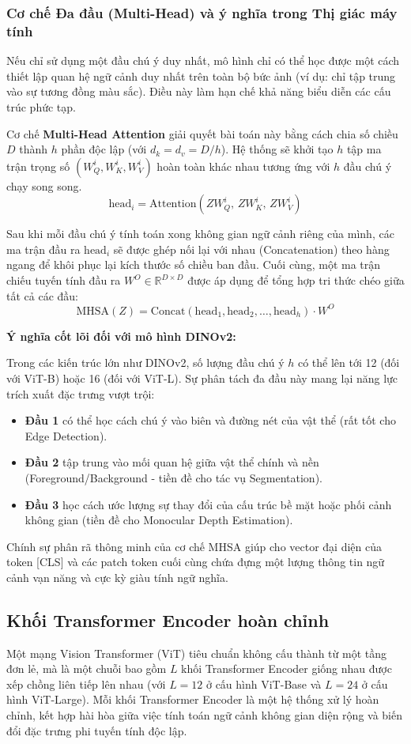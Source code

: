 \subsubsection{Cơ chế Đa đầu (Multi-Head) và ý nghĩa trong Thị giác máy tính}
Nếu chỉ sử dụng một đầu chú ý duy nhất, mô hình chỉ có thể học được một cách thiết lập quan hệ ngữ cảnh duy nhất trên toàn bộ bức ảnh (ví dụ: chỉ tập trung vào sự tương đồng màu sắc). Điều này làm hạn chế khả năng biểu diễn các cấu trúc phức tạp.

Cơ chế \textbf{Multi-Head Attention} giải quyết bài toán này bằng cách chia số chiều $D$ thành $h$ phần độc lập (với $d_k = d_v = D/h$). Hệ thống sẽ khởi tạo $h$ tập ma trận trọng số $(W_Q^i, W_K^i, W_V^i)$ hoàn toàn khác nhau tương ứng với $h$ đầu chú ý chạy song song.$$\text{head}_i = \text{Attention}(Z W_Q^i, \, Z W_K^i, \, Z W_V^i)$$

Sau khi mỗi đầu chú ý tính toán xong không gian ngữ cảnh riêng của mình, các ma trận đầu ra $\text{head}_i$ sẽ được ghép nối lại với nhau (Concatenation) theo hàng ngang để khôi phục lại kích thước số chiều ban đầu. Cuối cùng, một ma trận chiếu tuyến tính đầu ra $W^O \in \mathbb{R}^{D \times D}$ được áp dụng để tổng hợp tri thức chéo giữa tất cả các đầu:$$\text{MHSA}(Z) = \text{Concat}(\text{head}_1, \text{head}_2, \dots, \text{head}_h) \cdot W^O$$

\textbf{Ý nghĩa cốt lõi đối với mô hình DINOv2:}

Trong các kiến trúc lớn như DINOv2, số lượng đầu chú ý $h$ có thể lên tới 12 (đối với ViT-B) hoặc 16 (đối với ViT-L). Sự phân tách đa đầu này mang lại năng lực trích xuất đặc trưng vượt trội:
\begin{itemize}
    \item \textbf{Đầu 1} có thể học cách chú ý vào biên và đường nét của vật thể (rất tốt cho Edge Detection).
    \item \textbf{Đầu 2} tập trung vào mối quan hệ giữa vật thể chính và nền (Foreground/Background - tiền đề cho tác vụ Segmentation).
    \item \textbf{Đầu 3} học cách ước lượng sự thay đổi của cấu trúc bề mặt hoặc phối cảnh không gian (tiền đề cho Monocular Depth Estimation).
\end{itemize}

Chính sự phân rã thông minh của cơ chế MHSA giúp cho vector đại diện của token [CLS] và các patch token cuối cùng chứa đựng một lượng thông tin ngữ cảnh vạn năng và cực kỳ giàu tính ngữ nghĩa.
\subsection{Khối Transformer Encoder hoàn chỉnh}
Một mạng Vision Transformer (ViT) tiêu chuẩn không cấu thành từ một tầng đơn lẻ, mà là một chuỗi bao gồm $L$ khối Transformer Encoder giống nhau được xếp chồng liên tiếp lên nhau (với $L = 12$ ở cấu hình ViT-Base và $L = 24$ ở cấu hình ViT-Large). Mỗi khối Transformer Encoder là một hệ thống xử lý hoàn chỉnh, kết hợp hài hòa giữa việc tính toán ngữ cảnh không gian diện rộng và biến đổi đặc trưng phi tuyến tính độc lập.
